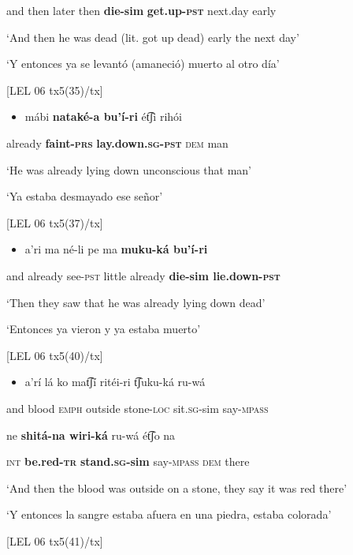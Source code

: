   and   then  later   then   \textbf{die-sim }\textbf{get.up-\textsc{pst}} next.day   early

  ‘And then he was dead (lit. got up dead) early the next day’

  ‘Y entonces ya se levantó (amaneció) muerto al otro día’

  [LEL 06 tx5(35)/tx]

\begin{itemize}
\item mábi     \textbf{nataké-a   bu’í-ri}   ét͡ʃi   rihói
\end{itemize}

  already    \textbf{faint-\textsc{prs}} \textbf{lay.down.\textsc{sg}}\textbf{{}-}\textbf{\textsc{pst}} \textsc{dem} man

  ‘He was already lying down unconscious that man’

  ‘Ya estaba desmayado ese señor’

  [LEL 06 tx5(37)/tx]

\begin{itemize}
\item a’ri   ma    né-li     pe   ma     \textbf{muku-ká   bu’í-ri} 
\end{itemize}

  and   already    see-\textsc{pst} little   already   \textbf{die-sim   lie.down-\textsc{pst}}

  ‘Then they saw that he was already lying down dead’

  ‘Entonces ya vieron y ya estaba muerto’

  [LEL 06 tx5(40)/tx]  

\begin{itemize}
\item a’rí   lá   ko   mat͡ʃí     ritéi-ri     t͡ʃuku-ká      ru-wá   
\end{itemize}

and   blood   \textsc{emph} outside    stone-\textsc{loc} sit\textsc{.sg}{}-sim say-\textsc{mpass} 

 ne    \textbf{shitá-na  wiri-ká}   ru-wá     ét͡ʃo   na

\textsc{int} \textbf{be.red-\textsc{tr}} \textbf{stand\textsc{.sg}}\textbf{{}-sim}   say-\textsc{mpass   dem} there

  ‘And then the blood was outside on a stone, they say it was red there’

  ‘Y entonces la sangre estaba afuera en una piedra, estaba colorada’

  [LEL 06 tx5(41)/tx]

